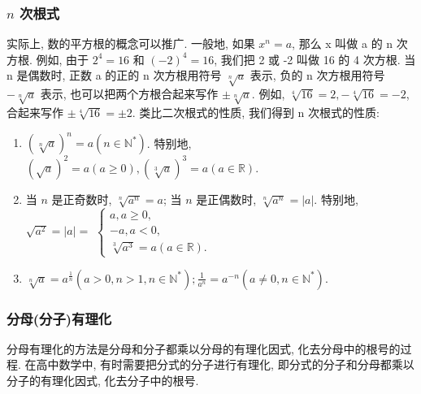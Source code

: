 \subsubsection{$n$ 次根式}
实际上, 数的平方根的概念可以推广. 一般地, 如果 $x^{n}=a$, 那么 x 叫做 a 的 n 次方根. 例如, 由于 $2^4=16$ 和 $(-2)^4=16$, 我们把 2 或 -2 叫做 16 的 4 次方根. 当 n 是偶数时, 正数 a 的正的 n 次方根用符号 $\sqrt[n]{a}$ 表示, 负的 n 次方根用符号 $-\sqrt[n]{a}$ 表示, 也可以把两个方根合起来写作 $\pm \sqrt[n]{a}$. 例如, $\sqrt[4]{16}=2,-\sqrt[4]{16}=-2$, 合起来写作 $\pm \sqrt[4]{16}= \pm 2$.
类比二次根式的性质, 我们得到 n 次根式的性质:
\begin{enumerate}
	\item $(\sqrt[n]{a})^{n}=a\left(n \in \mathbb{N}^*\right)$. 特别地, $(\sqrt{a})^2=a(a \geqslant 0),(\sqrt[3]{a})^3=a(a \in \mathbb{R})$.
	\item 当 $n$ 是正奇数时, $\sqrt[n]{a^n}=a$; 当 $n$ 是正偶数时, $\sqrt[n]{a^n}=|a|$. 特别地, $\sqrt{a^2}=|a|=$ $\left\{\begin{array}{l}a, a \geqslant 0, \\ -a, a<0, \\ \sqrt[3]{a^3}=a(a \in \mathbb{R}) .\end{array}\right.$
	\item $\sqrt[n]{a}=a^{\frac{1}{n}}\left(a>0, n>1, n \in \mathbb{N}^*\right) ; \frac{1}{a^n}=a^{-n}\left(a \neq 0, n \in \mathbb{N}^*\right)$.
\end{enumerate}
\subsubsection{分母(分子)有理化}
分母有理化的方法是分母和分子都乘以分母的有理化因式, 化去分母中的根号的过程. 在高中数学中, 有时需要把分式的分子进行有理化, 即分式的分子和分母都乘以分子的有理化因式, 化去分子中的根号.


